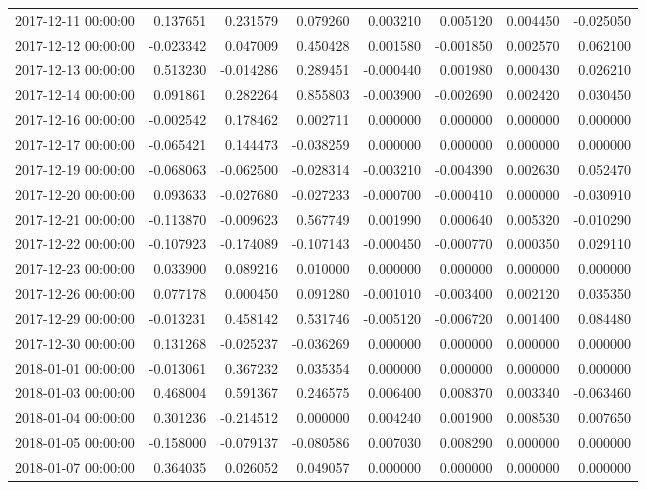 \begin{tabular}{lrrrrrrr}
2017-12-11 00:00:00 & 0.137651 & 0.231579 & 0.079260 & 0.003210 & 0.005120 & 0.004450 & -0.025050 \\
2017-12-12 00:00:00 & -0.023342 & 0.047009 & 0.450428 & 0.001580 & -0.001850 & 0.002570 & 0.062100 \\
2017-12-13 00:00:00 & 0.513230 & -0.014286 & 0.289451 & -0.000440 & 0.001980 & 0.000430 & 0.026210 \\
2017-12-14 00:00:00 & 0.091861 & 0.282264 & 0.855803 & -0.003900 & -0.002690 & 0.002420 & 0.030450 \\
2017-12-16 00:00:00 & -0.002542 & 0.178462 & 0.002711 & 0.000000 & 0.000000 & 0.000000 & 0.000000 \\
2017-12-17 00:00:00 & -0.065421 & 0.144473 & -0.038259 & 0.000000 & 0.000000 & 0.000000 & 0.000000 \\
2017-12-19 00:00:00 & -0.068063 & -0.062500 & -0.028314 & -0.003210 & -0.004390 & 0.002630 & 0.052470 \\
2017-12-20 00:00:00 & 0.093633 & -0.027680 & -0.027233 & -0.000700 & -0.000410 & 0.000000 & -0.030910 \\
2017-12-21 00:00:00 & -0.113870 & -0.009623 & 0.567749 & 0.001990 & 0.000640 & 0.005320 & -0.010290 \\
2017-12-22 00:00:00 & -0.107923 & -0.174089 & -0.107143 & -0.000450 & -0.000770 & 0.000350 & 0.029110 \\
2017-12-23 00:00:00 & 0.033900 & 0.089216 & 0.010000 & 0.000000 & 0.000000 & 0.000000 & 0.000000 \\
2017-12-26 00:00:00 & 0.077178 & 0.000450 & 0.091280 & -0.001010 & -0.003400 & 0.002120 & 0.035350 \\
2017-12-29 00:00:00 & -0.013231 & 0.458142 & 0.531746 & -0.005120 & -0.006720 & 0.001400 & 0.084480 \\
2017-12-30 00:00:00 & 0.131268 & -0.025237 & -0.036269 & 0.000000 & 0.000000 & 0.000000 & 0.000000 \\
2018-01-01 00:00:00 & -0.013061 & 0.367232 & 0.035354 & 0.000000 & 0.000000 & 0.000000 & 0.000000 \\
2018-01-03 00:00:00 & 0.468004 & 0.591367 & 0.246575 & 0.006400 & 0.008370 & 0.003340 & -0.063460 \\
2018-01-04 00:00:00 & 0.301236 & -0.214512 & 0.000000 & 0.004240 & 0.001900 & 0.008530 & 0.007650 \\
2018-01-05 00:00:00 & -0.158000 & -0.079137 & -0.080586 & 0.007030 & 0.008290 & 0.000000 & 0.000000 \\
2018-01-07 00:00:00 & 0.364035 & 0.026052 & 0.049057 & 0.000000 & 0.000000 & 0.000000 & 0.000000 \\

\end{tabular}
